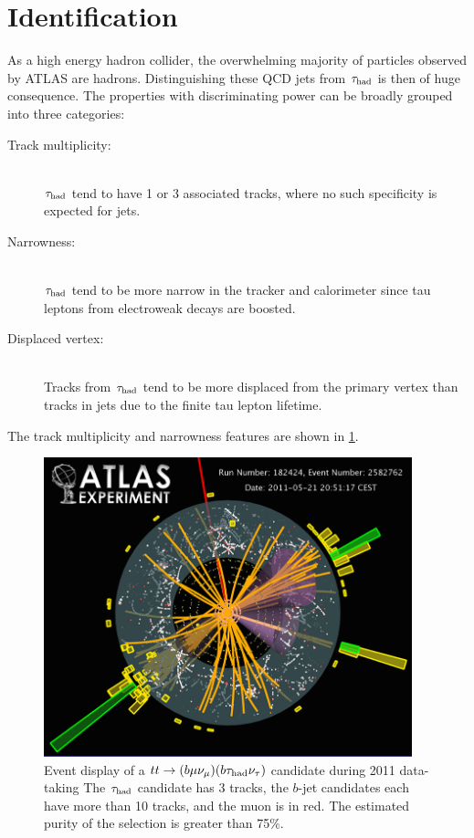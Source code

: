 \section{Identification}

As a high energy hadron collider, the overwhelming majority of particles observed by ATLAS are hadrons. Distinguishing these QCD jets from $\tau_\text{had}$ is then of huge consequence. The properties with discriminating power can be broadly grouped into three categories:
%
\begin{description}
    \item[Track multiplicity:] \hfill \\
      $\tau_\text{had}$ tend to have 1 or 3 associated tracks, where no such specificity is expected for jets.
    \item[Narrowness:]         \hfill \\
      $\tau_\text{had}$ tend to be more narrow in the tracker and calorimeter since tau leptons from electroweak decays are boosted.
    \item[Displaced vertex:]   \hfill \\
      Tracks from $\tau_\text{had}$ tend to be more displaced from the primary vertex than tracks in jets due to the finite tau lepton lifetime.
\end{description}
%
The track multiplicity and narrowness features are shown in \cref{fig:taus-eventdisplay}.

\begin{figure}[tp]
  \centering
  \includegraphics[width=0.95\textwidth]{figures/tauperformance/vp1_3dcocktail_run182424_evt2582762_tttaumu}
  \caption{Event display of a $tt \rightarrow (b\mu\nu_\mu)(b\tau_\text{had}\nu_\tau)$ candidate during 2011 data-taking The $\tau_\text{had}$ candidate has 3 tracks, the $b$-jet candidates each have more than 10 tracks, and the muon is in red. The estimated purity of the selection is greater than 75\%.}
  \label{fig:taus-eventdisplay}
\end{figure}

